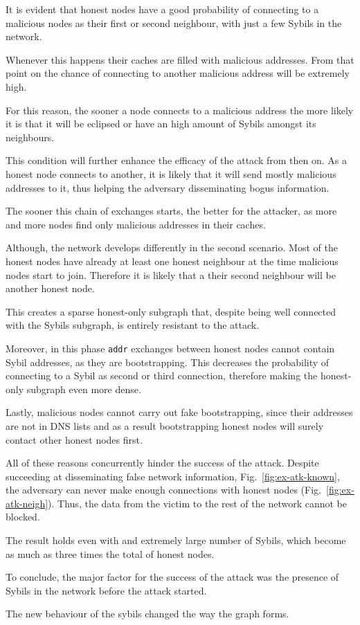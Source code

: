 It is evident that honest nodes have a good probability of connecting to a malicious nodes as their first or second neighbour, with just a few Sybils in the network.

Whenever this happens their caches are filled with malicious addresses. From that point on the chance of connecting to another malicious address will be extremely high.

For this reason, the sooner a node connects to a malicious address the more likely it is that it will be eclipsed or have an high amount of Sybils amongst its neighbours.

This condition will further enhance the efficacy of the attack from then on. As a honest node connects to another, it is likely that it will send mostly malicious addresses to it, thus helping the adversary disseminating bogus information.

The sooner this chain of exchanges starts, the better for the attacker, as more and more nodes find only malicious addresses in their caches.

Although, the network develops differently in the second scenario. Most of the honest nodes have already at least one honest neighbour at the time malicious nodes start to join. Therefore it is likely that a their second neighbour will be another honest node.

This creates a sparse honest-only subgraph that, despite being well connected with the Sybils subgraph, is entirely resistant to the attack.

Moreover, in this phase \texttt{addr} exchanges between honest nodes cannot contain Sybil addresses, as they are bootstrapping. This decreases the probability of connecting to a Sybil as second or third connection, therefore making the honest-only subgraph even more dense.

Lastly, malicious nodes cannot carry out fake bootstrapping, since their addresses are not in DNS lists and as a result bootstrapping honest nodes will surely contact other honest nodes first.

All of these reasons concurrently hinder the success of the attack. Despite succeeding at disseminating false network information, Fig.~\ref{fig:ex-atk-known}, the adversary can never make enough connections with honest nodes (Fig.~\ref{fig:ex-atk-neigh}).
Thus, the data from the victim to the rest of the network cannot be blocked.

The result holds even with and extremely large number of Sybils, which become as much as three times the total of honest nodes.

To conclude, the major factor for the success of the attack was the presence of Sybils in the network before the attack started.

The new behaviour of the sybils changed the way the graph forms.
